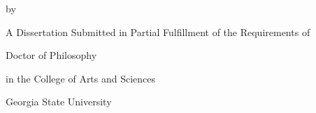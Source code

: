 \begin{center}
  \parbox[]{\textwidth}{\centering\titlediss}
\end{center}
\vspace*{1.5in}
\centerline{by}
\vspace*{1.5in}
\centerline{\writerUpper}
\vspace*{3.0in}

\centerline{A Dissertation Submitted in Partial Fulfillment of the Requirements of }
\centerline{Doctor of Philosophy}
\centerline{in the College of Arts and Sciences}
\centerline{Georgia State University}
\centerline{\gradYear}